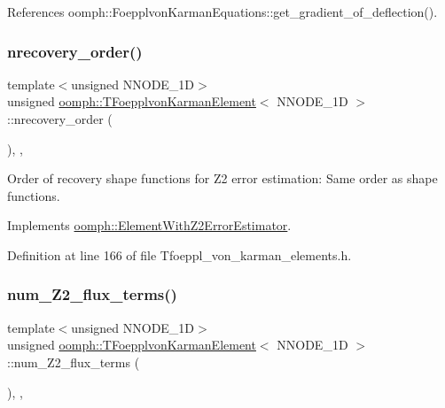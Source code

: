 References oomph\+::\+Foepplvon\+Karman\+Equations\+::get\+\_\+gradient\+\_\+of\+\_\+deflection().

\mbox{\label{classoomph_1_1TFoepplvonKarmanElement_a772d3db8d92b7cfd1a29984c8a92d0eb}} 
\subsubsection{\texorpdfstring{nrecovery\+\_\+order()}{nrecovery\_order()}}
{\footnotesize\ttfamily template$<$unsigned N\+N\+O\+D\+E\+\_\+1D$>$ \\
unsigned \hyperlink{classoomph_1_1TFoepplvonKarmanElement}{oomph\+::\+T\+Foepplvon\+Karman\+Element}$<$ N\+N\+O\+D\+E\+\_\+1D $>$\+::nrecovery\+\_\+order (\begin{DoxyParamCaption}{ }\end{DoxyParamCaption})\hspace{0.3cm}{\ttfamily [inline]}, {\ttfamily [protected]}, {\ttfamily [virtual]}}



Order of recovery shape functions for Z2 error estimation\+: Same order as shape functions. 



Implements \hyperlink{classoomph_1_1ElementWithZ2ErrorEstimator_af39480835bd3e0f6b2f4f7a9a4044798}{oomph\+::\+Element\+With\+Z2\+Error\+Estimator}.



Definition at line 166 of file Tfoeppl\+\_\+von\+\_\+karman\+\_\+elements.\+h.

\mbox{\label{classoomph_1_1TFoepplvonKarmanElement_a9ffd9e45449f8e542a3137ee73b56b5b}} 
\subsubsection{\texorpdfstring{num\+\_\+\+Z2\+\_\+flux\+\_\+terms()}{num\_Z2\_flux\_terms()}}
{\footnotesize\ttfamily template$<$unsigned N\+N\+O\+D\+E\+\_\+1D$>$ \\
unsigned \hyperlink{classoomph_1_1TFoepplvonKarmanElement}{oomph\+::\+T\+Foepplvon\+Karman\+Element}$<$ N\+N\+O\+D\+E\+\_\+1D $>$\+::num\+\_\+\+Z2\+\_\+flux\+\_\+terms (\begin{DoxyParamCaption}{ }\end{DoxyParamCaption})\hspace{0.3cm}{\ttfamily [inline]}, {\ttfamily [protected]}, {\ttfamily [virtual]}}



